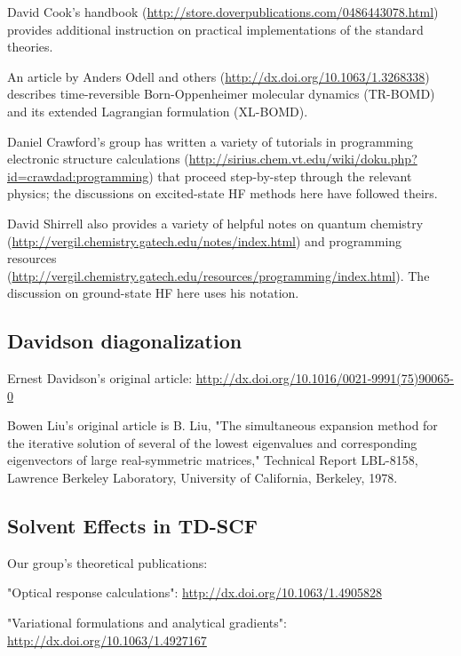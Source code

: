 \documentclass[12pt,letter,footinclude=true,headinclude=true,hyphens]{book} %
\begin{document}
    
    \noindent David Cook's handbook (\url{http://store.doverpublications.com/0486443078.html}) provides additional instruction on practical implementations of the standard theories.
    
    
    \noindent An article by Anders Odell and others (\url{http://dx.doi.org/10.1063/1.3268338}) describes time-reversible Born-Oppenheimer molecular dynamics (TR-BOMD) and its extended Lagrangian formulation (XL-BOMD).
    
    
    \noindent Daniel Crawford's group has written a variety of tutorials in programming electronic structure calculations (\url{http://sirius.chem.vt.edu/wiki/doku.php?id=crawdad:programming}) that proceed step-by-step through the relevant physics; the discussions on excited-state HF methods here have followed theirs.
    
    
    \noindent David Shirrell also provides a variety of helpful notes on quantum chemistry (\url{http://vergil.chemistry.gatech.edu/notes/index.html}) and programming resources (\url{http://vergil.chemistry.gatech.edu/resources/programming/index.html}). The discussion on ground-state HF here uses his notation.
    
    \subsection{Davidson diagonalization}
    
    Ernest Davidson's original article: \url{http://dx.doi.org/10.1016/0021-9991(75)90065-0}
    
    
    \noindent Bowen Liu's original article is
    B. Liu, "The simultaneous expansion method for the iterative solution of several of the lowest eigenvalues and corresponding eigenvectors of large real-symmetric matrices," Technical Report LBL-8158, Lawrence Berkeley Laboratory, University of California, Berkeley, 1978.
    
    \subsection{Solvent Effects in TD-SCF}
    
    Our group's theoretical publications:
    
    
    "Optical response calculations": \url{http://dx.doi.org/10.1063/1.4905828}
    
    
    "Variational formulations and analytical gradients": \url{http://dx.doi.org/10.1063/1.4927167}
    
\end{document}
